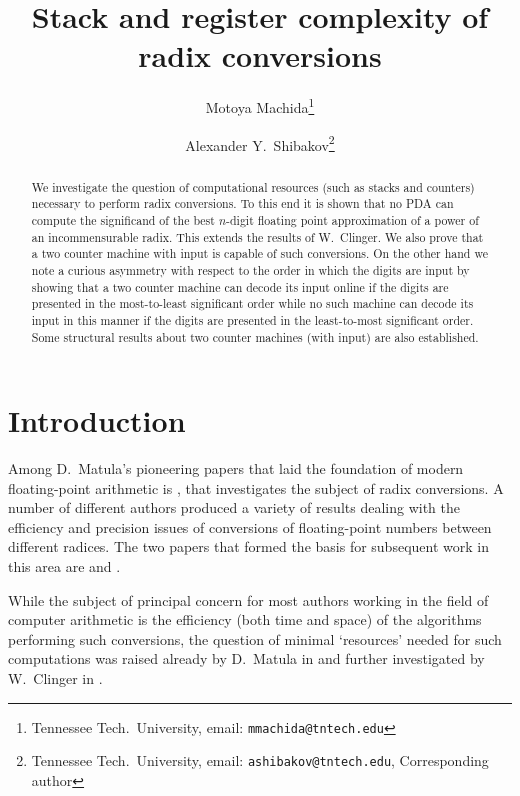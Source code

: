 \documentclass[12pt]{article}
\title{Stack and register complexity of radix conversions}
\author{Motoya Machida\footnote{Tennessee Tech.\ University, email: {\tt mmachida@tntech.edu}}\and 
Alexander Y.~Shibakov\footnote{Tennessee Tech.\ University, email: {\tt ashibakov@tntech.edu}, Corresponding author}}
\begin{document}
\maketitle
\begin{abstract}
We investigate the question of computational resources (such as stacks
and counters) necessary to perform radix conversions. To this end it
is shown that no PDA can compute the significand of the best
$n$-digit floating point approximation of a power of an
incommensurable radix. This extends the results of W.~Clinger. We also
prove that a two counter machine with input is capable of such conversions. On
the other hand we note a curious asymmetry with respect to the order in
which the digits are input by showing that a two counter machine can
decode its input online if the digits are presented in the
most-to-least significant order while no such machine can decode its input in this
manner if the digits are presented in the least-to-most significant
order. Some structural results about two counter machines (with input) are also
established.
\end{abstract}
\newtheorem{lemma}{Lemma}
\newtheorem{corollary}{Corollary}
\newtheorem{proposition}{Proposition}
\newtheorem{theorem}{Theorem}
\newtheorem{definition}{Definition}
\newtheorem{question}{Question}

\def\ttd{{\tt d}}
\def\ttD{{\tt D}}
\def\ttC{{\tt C}}
\def\ttb{{\tt b}}
\def\dg#1{\mathop{\to}\limits^{#1}}
\def\df#1{\mathop{\Rightarrow}\limits^{#1}}
\def\ndf#1{\mathop{\Rightarrow}\limits^{#1}\varnothing}
\def\nndf#1{\mathop{\not\Rightarrow}\limits^{#1}}
\def\dgn#1{\mathop{\to}\limits^{d_{#1}}}
\def\gstop{\diamond}

\section{Introduction}
Among D.~Matula's pioneering papers that laid the foundation of
modern floating-point arithmetic is \cite{Matulainout}, that investigates the
subject of radix conversions. A number of different authors produced a
variety of results dealing with the efficiency and precision issues of
conversions of floating-point numbers between different radices. The
two papers that formed the basis for subsequent work in this area are
\cite{Steele} and \cite{Clinger}. 

While the subject of principal concern for most authors working in
the field of computer arithmetic is the efficiency (both time and
space) of the algorithms performing such conversions, the question of
minimal `resources' needed for such computations was raised already by
D.~Matula in \cite{Matulainout} and further investigated by W.~Clinger
in \cite{Clinger}.
\end{document}
